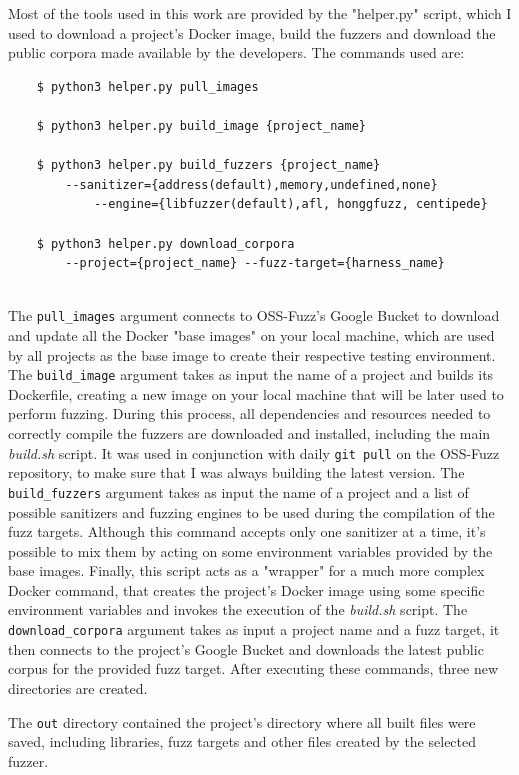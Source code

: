 Most of the tools used in this work are provided by the "helper.py" script, which I used to download a project's Docker image, build the fuzzers and download the public corpora made available by the developers.
The commands used are:
\begin{verbatim}
    $ python3 helper.py pull_images 

    $ python3 helper.py build_image {project_name}

    $ python3 helper.py build_fuzzers {project_name}
        --sanitizer={address(default),memory,undefined,none} 
            --engine={libfuzzer(default),afl, honggfuzz, centipede}
        
    $ python3 helper.py download_corpora 
        --project={project_name} --fuzz-target={harness_name}
\end{verbatim}
\ \\
The \verb|pull_images| argument connects to OSS-Fuzz's Google Bucket to download and update all the Docker "base images" on your local machine, which are used by all projects as the base image to create their respective testing environment.
The \verb|build_image| argument takes as input the name of a project and builds its Dockerfile, creating a new image on your local machine that will be later used to perform fuzzing. During this process, all dependencies and resources needed to correctly compile the fuzzers are downloaded and installed, including the main \textit{build.sh} script. It was used in conjunction with daily \verb|git pull| on the OSS-Fuzz repository, to make sure that I was always building the latest version. 
The \verb|build_fuzzers| argument takes as input the name of a project and a list of possible sanitizers and fuzzing engines to be used during the compilation of the fuzz targets. Although this command accepts only one sanitizer at a time, it's possible to mix them by acting on some environment variables provided by the base images. Finally, this script acts as a "wrapper" for a much more complex Docker command, that creates the project's Docker image using some specific environment variables and invokes the execution of the \textit{build.sh} script.
The \verb|download_corpora| argument takes as input a project name and a fuzz target, it then connects to the project's Google Bucket and downloads the latest public corpus for the provided fuzz target.
After executing these commands, three new directories are created.

The \verb|out| directory contained the project's directory where all built files were saved, including libraries, fuzz targets and other files created by the selected fuzzer.

